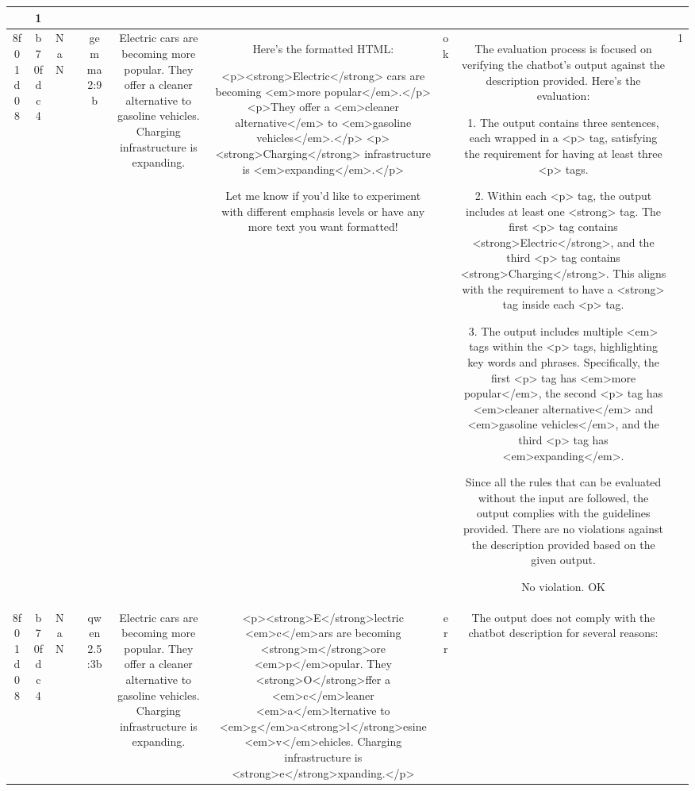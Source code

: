 \begin{table}[h!]
\begin{tabular}{|c|c|c|c|c|c|c|c|c|c|}
{{No part of the evaluation involves needing to know the input, so I do not need to check the correctness of the tagged content against any input. Based purely on compliance with the requirements in the description, this output satisfies all the rules that need checking. 

No violation.
OK & 1\\
\hline
8f01d08 & b70fdc4 & NaN &  & gemma2:9b & Electric cars are becoming more popular. They offer a cleaner alternative to gasoline vehicles. Charging infrastructure is expanding. & Here's the formatted HTML:

<p><strong>Electric</strong> cars are becoming <em>more popular</em>.</p>
<p>They offer a <em>cleaner alternative</em> to <em>gasoline vehicles</em>.</p>
<p><strong>Charging</strong> infrastructure is <em>expanding</em>.</p> 


Let me know if you'd like to experiment with different emphasis levels or have any more text you want formatted! & ok & The evaluation process is focused on verifying the chatbot's output against the description provided. Here's the evaluation:

1. The output contains three sentences, each wrapped in a <p> tag, satisfying the requirement for having at least three <p> tags.

2. Within each <p> tag, the output includes at least one <strong> tag. The first <p> tag contains <strong>Electric</strong>, and the third <p> tag contains <strong>Charging</strong>. This aligns with the requirement to have a <strong> tag inside each <p> tag.

3. The output includes multiple <em> tags within the <p> tags, highlighting key words and phrases. Specifically, the first <p> tag has <em>more popular</em>, the second <p> tag has <em>cleaner alternative</em> and <em>gasoline vehicles</em>, and the third <p> tag has <em>expanding</em>.

Since all the rules that can be evaluated without the input are followed, the output complies with the guidelines provided. There are no violations against the description provided based on the given output.

No violation.
OK & 1\\
\hline
8f01d08 & b70fdc4 & NaN &  & qwen2.5:3b & Electric cars are becoming more popular. They offer a cleaner alternative to gasoline vehicles. Charging infrastructure is expanding. & <p><strong>E</strong>lectric <em>c</em>ars are becoming <strong>m</strong>ore <em>p</em>opular. They <strong>O</strong>ffer a <em>c</em>leaner <em>a</em>lternative to <em>g</em>a<strong>l</strong>esine <em>v</em>ehicles. Charging infrastructure is <strong>e</strong>xpanding.</p> & err & The output does not comply with the chatbot description for several reasons:

}}
\end{tabular}
\end{table}
